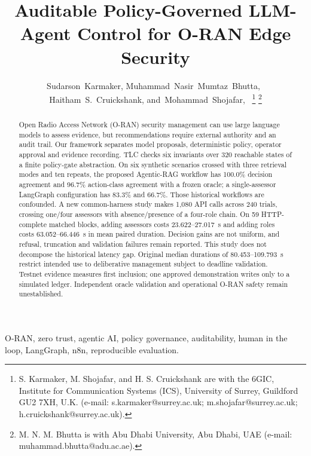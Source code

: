 \documentclass[journal]{IEEEtran}
\newif\ifshowrevisions
\newenvironment{revision}{\begingroup\ifshowrevisions\color{blue}\else\color{black}\fi}{\endgroup}
\begin{document}
\title{Auditable Policy-Governed LLM-Agent Control for O-RAN Edge Security}
\author{Sudarson~Karmaker,
        Muhammad~Nasir~Mumtaz~Bhutta,~\\
        Haitham~S.~Cruickshank, and~Mohammad~Shojafar,~%
\thanks{S. Karmaker, M. Shojafar, and H. S. Cruickshank are with the 6GIC,
Institute for Communication Systems (ICS), University of Surrey, Guildford
GU2 7XH, U.K. (e-mail: s.karmaker@surrey.ac.uk; m.shojafar@surrey.ac.uk;
h.cruickshank@surrey.ac.uk).}%
\thanks{M. N. M. Bhutta is with Abu Dhabi University, Abu Dhabi, UAE
(e-mail: muhammad.bhutta@adu.ac.ae).}}
\maketitle

\begin{abstract}
\begin{revision}
Open Radio Access Network (O-RAN) security management can use large language
models to assess evidence, but recommendations require external authority
and an audit trail. Our framework separates model proposals, deterministic
policy, operator approval and evidence recording. TLC checks six invariants
over 320 reachable states of a finite policy-gate abstraction. On six
synthetic scenarios crossed with three retrieval modes and ten repeats,
the proposed Agentic-RAG workflow has 100.0\% decision agreement and 96.7\%
action-class agreement with a frozen oracle; a single-assessor LangGraph
configuration has 83.3\% and 66.7\%. Those historical workflows are confounded.
A new common-harness study makes 1,080 API calls across 240 trials, crossing
one/four assessors with absence/presence of a four-role chain. On 59
HTTP-complete matched blocks, adding assessors costs 23.622--27.017~s and
adding roles costs 63.052--66.446~s in mean paired duration. Decision gains
are not uniform, and refusal, truncation and validation failures remain
reported. This study does not decompose the historical latency gap.
Original median durations of 80.453--109.793~s restrict intended use to
deliberative management subject to deadline validation. Testnet evidence
measures first inclusion; one approved demonstration writes only to a
simulated ledger. Independent oracle validation and operational O-RAN
safety remain unestablished.
\end{revision}
\end{abstract}

\begin{IEEEkeywords}
O-RAN, zero trust, agentic AI, policy governance, auditability, human in the
loop, LangGraph, n8n, reproducible evaluation.
\end{IEEEkeywords}
\end{document}
